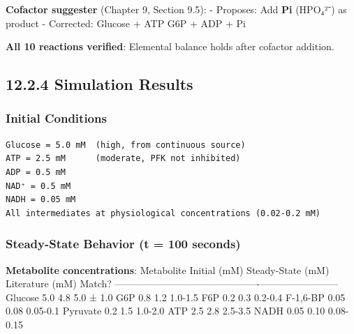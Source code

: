 \textbf{Cofactor suggester} (Chapter 9, Section 9.5): - Proposes: Add
\textbf{Pi} (HPO₄²⁻) as product - Corrected: Glucose + ATP \textrightarrow G6P + ADP +
Pi \checkmark

\textbf{All 10 reactions verified}: Elemental balance holds after
cofactor addition.

\hypertarget{simulation-results}{%
\subsection{12.2.4 Simulation Results}\label{simulation-results}}

\hypertarget{initial-conditions}{%
\subsubsection{Initial Conditions}\label{initial-conditions}}

\begin{lstlisting}
Glucose = 5.0 mM  (high, from continuous source)
ATP = 2.5 mM      (moderate, PFK not inhibited)
ADP = 0.5 mM
NAD⁺ = 0.5 mM
NADH = 0.05 mM
All intermediates at physiological concentrations (0.02-0.2 mM)
\end{lstlisting}

\hypertarget{steady-state-behavior-t-100-seconds}{%
\subsubsection{Steady-State Behavior (t = 100
seconds)}\label{steady-state-behavior-t-100-seconds}}

\textbf{Metabolite concentrations}: \textbar{} Metabolite \textbar{}
Initial (mM) \textbar{} Steady-State (mM) \textbar{} Literature (mM)
\textbar{} Match? \textbar{}
\textbar------------\textbar--------------\textbar-------------------\textbar-----------------\textbar--------\textbar{}
\textbar{} Glucose \textbar{} 5.0 \textbar{} 4.8 \textbar{} 5.0 ± 1.0
\textbar{} \checkmark \textbar{} \textbar{} G6P \textbar{} 0.8 \textbar{} 1.2
\textbar{} 1.0-1.5 \textbar{} \checkmark \textbar{} \textbar{} F6P \textbar{} 0.2
\textbar{} 0.3 \textbar{} 0.2-0.4 \textbar{} \checkmark \textbar{} \textbar{}
F-1,6-BP \textbar{} 0.05 \textbar{} 0.08 \textbar{} 0.05-0.1 \textbar{}
\checkmark \textbar{} \textbar{} Pyruvate \textbar{} 0.2 \textbar{} 1.5
\textbar{} 1.0-2.0 \textbar{} \checkmark \textbar{} \textbar{} ATP \textbar{} 2.5
\textbar{} 2.8 \textbar{} 2.5-3.5 \textbar{} \checkmark \textbar{} \textbar{}
NADH \textbar{} 0.05 \textbar{} 0.10 \textbar{} 0.08-0.15 \textbar{} \checkmark
\textbar{}

